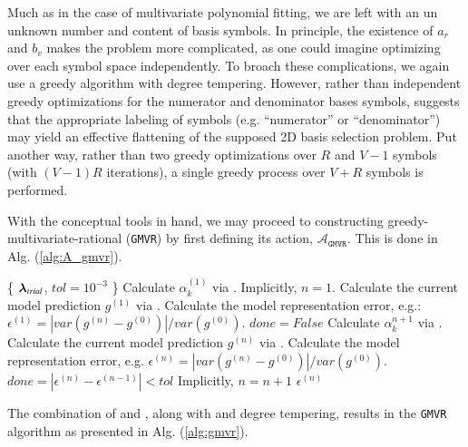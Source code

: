\documentclass[twocolumn,aps,prd,floatfix,preprintnumbers,a4paper,nofootinbib,
superscriptaddress,10pt]{revtex4-1}
\def\gmvr#1{greedy-multivariate-rational#1
  (\texttt{GMVR}#1)\gdef\gmvr{\texttt{GMVR}}}
\begin{document}
%
\par Much as in the case of multivariate polynomial fitting, we are left with an un unknown number and content of basis symbols.
%
In principle, the existence of $a_r$ and $b_v$ makes the problem more complicated, as one could imagine optimizing over each symbol space independently.
%
To broach these complications, we again use a greedy algorithm with degree tempering.
%
However, rather than independent greedy optimizations for the numerator and denominator bases symbols,  suggests that the appropriate labeling of symbols (e.g. ``numerator'' or ``denominator'') may yield an effective flattening of the supposed 2D basis selection problem.
%
Put another way, rather than two greedy optimizations over $R$ and $V-1$ symbols (with $(V-1)R$ iterations), a single greedy process over $V+R$ symbols is performed.
%
\par With the conceptual tools in hand, we may proceed to constructing \gmvr{} by first defining its action, $\mathcal{A}_{\gmvr}$.
%
This is done in Alg. (\ref{alg:A_gmvr}).
%
\hspace{1cm}
{\scriptsize
\begin{algorithm}[H]
  \caption{$\mathcal{A}_{\gmvr}$, the action for \gmvr. Model calculation given basis symbols, and output of model error estimate.}
  \label{alg:A_gmvr}
  \begin{algorithmic}[1]
     \{ ${\bm{\lambda}}_{trial}$, $tol=10^{-3}$ \}
    \vskip 10pt
    \State Calculate $\alpha^{(1)}_k$ via . Implicitly, $n=1$.
    \State Calculate the current model prediction $g^{(1)}$ via .
    \State Calculate the model representation error, e.g.: $\epsilon^{(1)}  = |var(g^{(n)} - g^{(0)})|/var(g^{(0)})$.
    \State $done = False$
      \State Calculate $\alpha^{n+1}_{k}$  via .
      \State Calculate the current model prediction $g^{(n)}$ via .
      \State Calculate the model representation error, e.g. $\epsilon^{(n)} = |var(g^{(n)} - g^{(0)})|/var(g^{(0)})$.
      \State $done = |\epsilon^{(n)}-\epsilon^{(n-1)}| < tol$
      \State Implicitly, $n = n+1$
    \EndWhile
    \vskip 10pt
     $\epsilon^{(n)}$
  \end{algorithmic}
\end{algorithm}
}
%
\par The combination of  and , along with \pgreedy{} and degree tempering, results in the \gmvr{} algorithm as presented in Alg. (\ref{alg:gmvr}).
\end{document}
